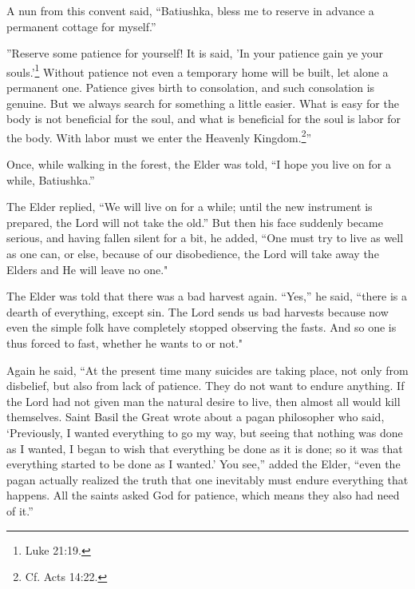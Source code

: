 A nun from this convent said, “Batiushka, bless me to reserve in advance a permanent cottage for myself.”

''Reserve some patience for yourself! It is said, 'In your patience gain ye your souls.'\footnote{Luke 21:19.} Without patience not even a temporary home will be built, let alone a permanent one. Patience gives birth to consolation, and such consolation is genuine. But we always search for something a little easier. What is easy for the body is not beneficial for the soul, and what is beneficial for the soul is labor for the body. With labor must we enter the Heavenly Kingdom.\footnote{Cf. Acts 14:22.}”

Once, while walking in the forest, the Elder was told, “I hope you live on for a while, Batiushka.”

The Elder replied, “We will live on for a while; until the new instrument is prepared, the Lord will not take the old.” But then his face suddenly became serious, and having fallen silent for a bit, he added, “One must try to live as well as one can, \label{ch5obedience}or else, because of our disobedience, the Lord will take away the Elders and He will leave no one."

The Elder was told that there was a bad harvest again. “Yes,” he said, “there is a dearth of everything, except sin. The Lord sends us bad harvests because now even the simple folk have completely stopped observing the fasts. And so one is thus forced to fast, whether he wants to or not."

Again he said, “At the present time many suicides are taking place, not only from disbelief, but also from lack of patience. They do not want to endure anything. If the Lord had not given man the natural desire to live, then almost all would kill themselves. Saint Basil the Great wrote about a pagan philosopher who said, ‘Previously, I wanted everything to go my way, but seeing that nothing was done as I wanted, I began to wish that everything be done as it is done; so it was that everything started to be done as I wanted.' You see,” added the Elder, “even the pagan actually realized the truth that one inevitably must endure everything that happens. All the saints asked God for patience, which means they also had need of it.”

